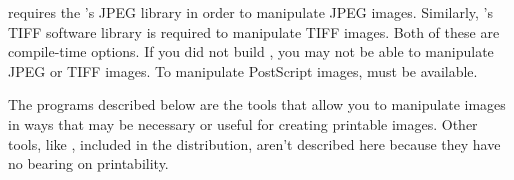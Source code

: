    requires the 's JPEG library
  in order to manipulate JPEG images.  
  Similarly, 's
  TIFF software library is required to manipulate TIFF images.
  Both of these are compile-time options.  If you did not build
  , you may not be able to manipulate JPEG or TIFF
  images.  To manipulate PostScript images, 
  must be available.

  The programs described below are the  tools that
  allow you to manipulate images in ways that may be necessary
  or useful for creating printable images.  Other tools, like 
  , included in the  distribution,
  aren't described here because they have no bearing on printability.
 
